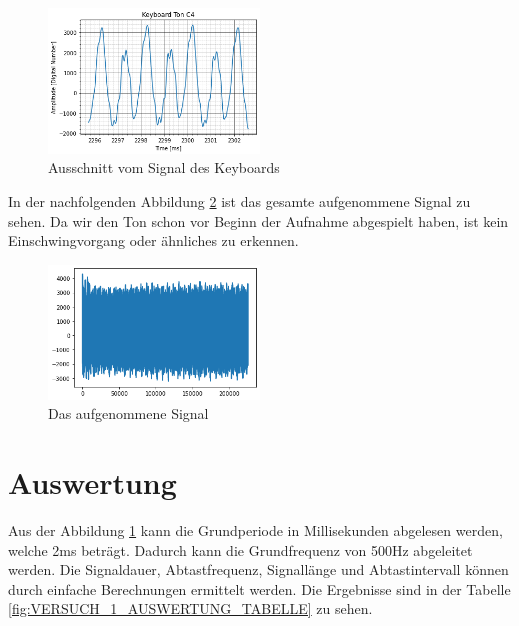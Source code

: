 \documentclass[12pt, oneside, a4paper, \docLanguage]{report}
\begin{document}
\begin{figure}[H]
	\centering\small
	\includegraphics[width=0.5\textwidth]{media/plotDecodedRichtig.png}
	\caption{Ausschnitt vom Signal des Keyboards}
	\label{fig:VERSUCH_1_PERIODEN}
\end{figure}

In der nachfolgenden Abbildung \ref{fig:VERSUCH_1_DR} ist das gesamte aufgenommene Signal zu sehen. Da wir den Ton schon vor Beginn der Aufnahme abgespielt haben, ist kein Einschwingvorgang oder ähnliches zu erkennen.

\begin{figure}[H]
	\centering\small
	\includegraphics[width=0.5\textwidth]{media/decodedRichtig.png}
	\caption{Das aufgenommene Signal}
	\label{fig:VERSUCH_1_DR}
\end{figure}
\newpage
\section{Auswertung}
\label{chap:VERSUCH_1_AUSWERTUNG}
Aus der Abbildung \ref{fig:VERSUCH_1_PERIODEN} kann die Grundperiode in Millisekunden abgelesen werden, welche 2ms beträgt. Dadurch kann die Grundfrequenz von 500Hz abgeleitet werden. Die Signaldauer, Abtastfrequenz, Signallänge und Abtastintervall können durch einfache Berechnungen ermittelt werden. Die Ergebnisse sind in der Tabelle \ref{fig:VERSUCH_1_AUSWERTUNG_TABELLE} zu sehen.
\end{document}
